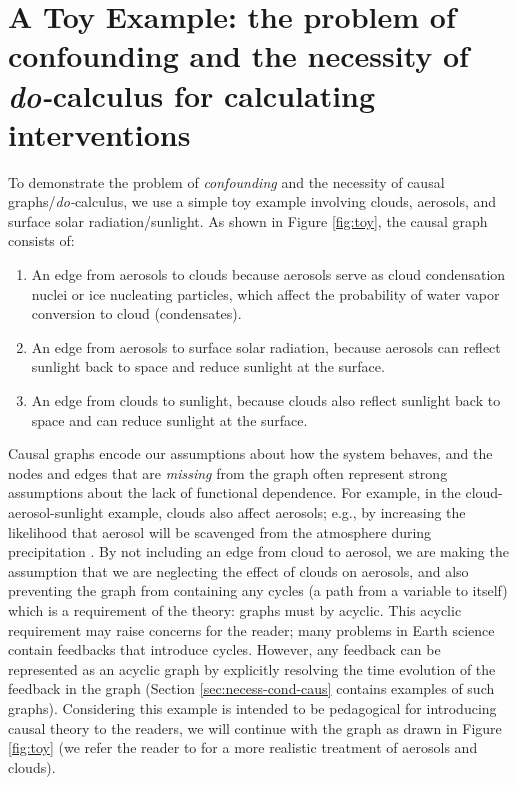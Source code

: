 \documentclass[12pt]{article}
\begin{document}
\section{A Toy Example: the problem of confounding and the necessity
  of \textit{do-}calculus for calculating interventions}
\label{sec:causal-graphs-pearls}

To demonstrate the problem of \textit{confounding} and the necessity
of causal graphs/\textit{do-}calculus, we use a simple toy
example involving clouds, aerosols, and surface solar
radiation/sunlight. As shown in Figure \ref{fig:toy}, the causal
graph consists of:

\begin{enumerate}
\item An edge from aerosols to clouds because aerosols serve as cloud
  condensation nuclei or ice nucleating particles, which affect the probability of water vapor conversion to cloud (condensates).
\item An edge from aerosols to surface solar radiation, because
  aerosols can reflect sunlight back to space and reduce sunlight at
  the surface.
\item An edge from clouds to sunlight, because clouds also reflect
  sunlight back to space and can reduce sunlight at the surface.
\end{enumerate}

Causal graphs encode our assumptions about how the system behaves, and
the nodes and edges that are \textit{missing} from the graph often
represent strong assumptions about the lack of functional
dependence. For example, in the cloud-aerosol-sunlight example, clouds
also affect aerosols; e.g., by increasing the likelihood that aerosol
will be scavenged from the atmosphere during precipitation
\citep[e.g.,][]{radke-scavenge-1980, jurado2008,
  blanco-alegre2018}. By not including an edge from cloud to aerosol,
we are making the assumption that we are neglecting the effect of
clouds on aerosols, and also preventing the graph from containing any
cycles (a path from a variable to itself) which is a requirement of
the theory: graphs must by acyclic. This acyclic requirement may raise
concerns for the reader; many problems in Earth science contain
feedbacks that introduce cycles. However, any feedback can be
represented as an acyclic graph by explicitly resolving the time
evolution of the feedback in the graph (Section
\ref{sec:necess-cond-caus} contains examples of such graphs).
Considering this example is intended to be pedagogical for introducing
causal theory to the readers, we will continue with the graph as drawn
in Figure \ref{fig:toy} (we refer the reader to \cite{gryspeerdt-2019}
for a more realistic treatment of aerosols and clouds).
\end{document}
